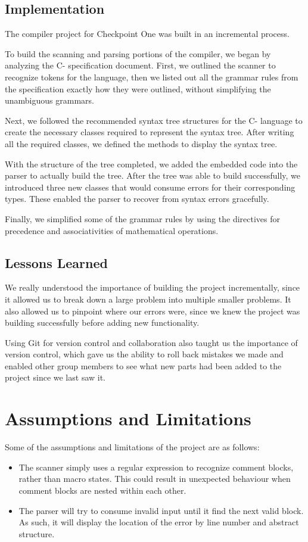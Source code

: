 \documentclass[12pt,letterpaper]{article}
\begin{document}
\subsection{Implementation}
The compiler project for Checkpoint One was built in an incremental process.\par
To build the scanning and parsing portions of the compiler, we began by analyzing the C- specification document. First, we outlined the scanner to recognize tokens for the language, then we listed out all the grammar rules from the specification exactly how they were outlined, without simplifying the unambiguous grammars.\par
Next, we followed the recommended syntax tree structures for the C- language to create the necessary classes required to represent the syntax tree. After writing all the required classes, we defined the methods to display the syntax tree.\par
With the structure of the tree completed, we added the embedded code into the parser to actually build the tree. After the tree was able to build successfully, we introduced three new classes that would consume errors for their corresponding types. These enabled the parser to recover from syntax errors gracefully.\par
Finally, we simplified some of the grammar rules by using the directives for precedence and associativities of mathematical operations.\par

\subsection{Lessons Learned}
We really understood the importance of building the project incrementally, since it allowed us to break down a large problem into multiple smaller problems. It also allowed us to pinpoint where our errors were, since we knew the project was building successfully before adding new functionality.\par
Using Git for version control and collaboration also taught us the importance of version control, which gave us the ability to roll back mistakes we made and enabled other group members to see what new parts had been added to the project since we last saw it.\par

\section{Assumptions and Limitations}
Some of the assumptions and limitations of the project are as follows:
\begin{itemize}
\item The scanner simply uses a regular expression to recognize comment blocks, rather than macro states. This could result in unexpected behaviour when comment blocks are nested within each other.
\item The parser will try to consume invalid input until it find the next valid block. As such, it will display the location of the error by line number and abstract structure.
\end{itemize}
\end{document}
